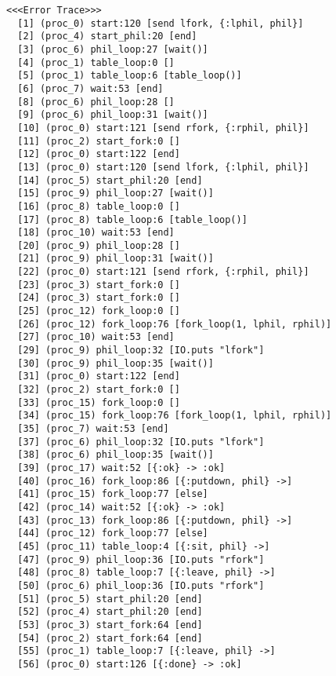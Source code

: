 \begin{lstlisting}[xleftmargin=.01\linewidth, xrightmargin=0.01\linewidth, caption={Dining Philosophers Verlixir Report.}, label={lst:dp_bug}]
  <<<Error Trace>>>
  [1] (proc_0) start:120 [send lfork, {:lphil, phil}]
  [2] (proc_4) start_phil:20 [end]
  [3] (proc_6) phil_loop:27 [wait()]
  [4] (proc_1) table_loop:0 []
  [5] (proc_1) table_loop:6 [table_loop()]
  [6] (proc_7) wait:53 [end]
  [8] (proc_6) phil_loop:28 []
  [9] (proc_6) phil_loop:31 [wait()]
  [10] (proc_0) start:121 [send rfork, {:rphil, phil}]
  [11] (proc_2) start_fork:0 []
  [12] (proc_0) start:122 [end]
  [13] (proc_0) start:120 [send lfork, {:lphil, phil}]
  [14] (proc_5) start_phil:20 [end]
  [15] (proc_9) phil_loop:27 [wait()]
  [16] (proc_8) table_loop:0 []
  [17] (proc_8) table_loop:6 [table_loop()]
  [18] (proc_10) wait:53 [end]
  [20] (proc_9) phil_loop:28 []
  [21] (proc_9) phil_loop:31 [wait()]
  [22] (proc_0) start:121 [send rfork, {:rphil, phil}]
  [23] (proc_3) start_fork:0 []
  [24] (proc_3) start_fork:0 []
  [25] (proc_12) fork_loop:0 []
  [26] (proc_12) fork_loop:76 [fork_loop(1, lphil, rphil)]
  [27] (proc_10) wait:53 [end]
  [29] (proc_9) phil_loop:32 [IO.puts "lfork"]
  [30] (proc_9) phil_loop:35 [wait()]
  [31] (proc_0) start:122 [end]
  [32] (proc_2) start_fork:0 []
  [33] (proc_15) fork_loop:0 []
  [34] (proc_15) fork_loop:76 [fork_loop(1, lphil, rphil)]
  [35] (proc_7) wait:53 [end]
  [37] (proc_6) phil_loop:32 [IO.puts "lfork"]
  [38] (proc_6) phil_loop:35 [wait()]
  [39] (proc_17) wait:52 [{:ok} -> :ok]
  [40] (proc_16) fork_loop:86 [{:putdown, phil} ->]
  [41] (proc_15) fork_loop:77 [else]
  [42] (proc_14) wait:52 [{:ok} -> :ok]
  [43] (proc_13) fork_loop:86 [{:putdown, phil} ->]
  [44] (proc_12) fork_loop:77 [else]
  [45] (proc_11) table_loop:4 [{:sit, phil} ->]
  [47] (proc_9) phil_loop:36 [IO.puts "rfork"]
  [48] (proc_8) table_loop:7 [{:leave, phil} ->]
  [50] (proc_6) phil_loop:36 [IO.puts "rfork"]
  [51] (proc_5) start_phil:20 [end]
  [52] (proc_4) start_phil:20 [end]
  [53] (proc_3) start_fork:64 [end]
  [54] (proc_2) start_fork:64 [end]
  [55] (proc_1) table_loop:7 [{:leave, phil} ->]
  [56] (proc_0) start:126 [{:done} -> :ok]
\end{lstlisting}

